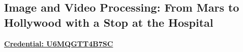 \subsection{Image and Video Processing: From Mars to Hollywood with a Stop at the Hospital}
\vspace{\topsep}
\href{https://www.coursera.org/account/accomplishments/certificate/U6MQGTT4B7SC}{\bf Credential: U6MQGTT4B7SC}

\sectionspace
